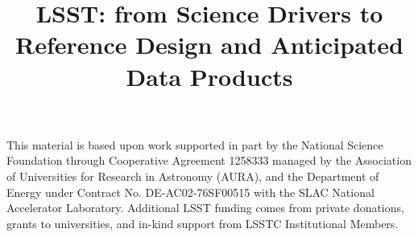 \documentclass[twocolumn,trackchanges]{aastex62}
\begin{document}
\title{LSST: from Science Drivers to Reference Design and Anticipated Data Products}













\acknowledgments
This material is based upon work supported in part by the National Science Foundation
through Cooperative Agreement 1258333 managed by the Association of Universities for
Research in Astronomy (AURA), and the Department of Energy under Contract No.
DE-AC02-76SF00515 with the SLAC National Accelerator Laboratory. Additional LSST
funding comes from private donations, grants to universities, and in-kind support from
LSSTC Institutional Members.





\listofchanges
\end{document}
